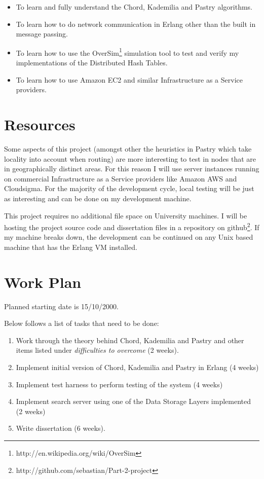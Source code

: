 \begin{itemize}

\item To learn and fully understand the Chord, Kademilia and Pastry algorithms.

\item To learn how to do network communication in Erlang other than the built in message passing.

\item To learn how to use the OverSim\footnote{http://en.wikipedia.org/wiki/OverSim} simulation tool to test and verify my implementations of the Distributed Hash Tables.

\item To learn how to use Amazon EC2 and similar Infrastructure as a Service providers.

\end{itemize}


\section*{Resources}

Some aspects of this project (amongst other the heuristics in Pastry which take locality into account when routing) are more interesting to test in nodes that are in geographically distinct areas. For this reason I will use server instances running on commercial Infrastructure as a Service providers like Amazon AWS and Cloudsigma. For the majority of the development cycle, local testing will be just as interesting and can be done on my development machine.

This project requires no additional file space on University machines. I will be hosting the project source code and dissertation files in a repository on github\footnote{http://github.com/sebastian/Part-2-project}.
If my machine breaks down, the development can be continued on any Unix based machine that has the Erlang VM installed.

\section*{Work Plan}

Planned starting date is 15/10/2000. 

Below follows a list of tasks that need to be done:

\begin{enumerate}
  \item Work through the theory behind Chord, Kademilia and Pastry and other items listed under \emph{difficulties to overcome} (2 weeks).
  \item Implement initial version of Chord, Kademilia and Pastry in Erlang (4 weeks)
  \item Implement test harness to perform testing of the system (4 weeks)
  \item Implement search server using one of the Data Storage Layers implemented (2 weeks)
  \item Write dissertation (6 weeks).
\end{enumerate}

